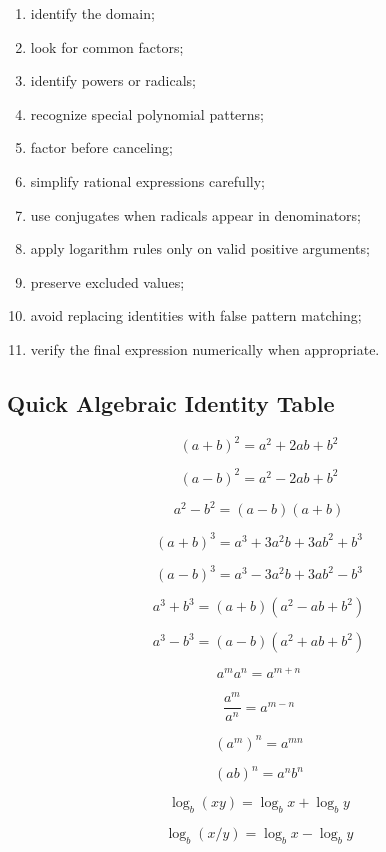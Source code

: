 \begin{enumerate}
    \item identify the domain;
    \item look for common factors;
    \item identify powers or radicals;
    \item recognize special polynomial patterns;
    \item factor before canceling;
    \item simplify rational expressions carefully;
    \item use conjugates when radicals appear in denominators;
    \item apply logarithm rules only on valid positive arguments;
    \item preserve excluded values;
    \item avoid replacing identities with false pattern matching;
    \item verify the final expression numerically when appropriate.
\end{enumerate}

\subsection{Quick Algebraic Identity Table}
\label{subsec:quick-algebraic-identity-table}

\[
\boxed{
(a+b)^2
=
a^2+2ab+b^2
}
\]

\[
\boxed{
(a-b)^2
=
a^2-2ab+b^2
}
\]

\[
\boxed{
a^2-b^2
=
(a-b)(a+b)
}
\]

\[
\boxed{
(a+b)^3
=
a^3+3a^2b+3ab^2+b^3
}
\]

\[
\boxed{
(a-b)^3
=
a^3-3a^2b+3ab^2-b^3
}
\]

\[
\boxed{
a^3+b^3
=
(a+b)(a^2-ab+b^2)
}
\]

\[
\boxed{
a^3-b^3
=
(a-b)(a^2+ab+b^2)
}
\]

\[
\boxed{
a^m a^n
=
a^{m+n}
}
\]

\[
\boxed{
\frac{a^m}{a^n}
=
a^{m-n}
}
\]

\[
\boxed{
(a^m)^n
=
a^{mn}
}
\]

\[
\boxed{
(ab)^n
=
a^nb^n
}
\]

\[
\boxed{
\log_b(xy)
=
\log_bx+\log_by
}
\]

\[
\boxed{
\log_b(x/y)
=
\log_bx-\log_by
}
\]

